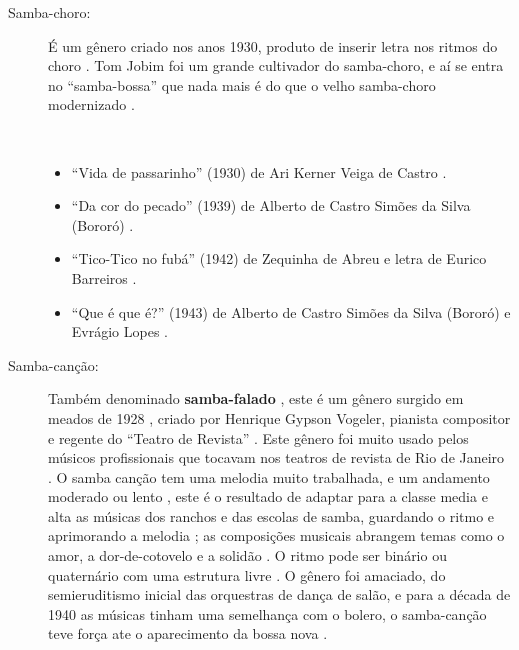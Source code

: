 \begin{description}
\item[Samba-choro:] 
É um gênero criado nos anos 1930, produto de inserir letra nos ritmos do choro \cite[pp. 291]{dourado2004dicionario}.
Tom Jobim foi um grande cultivador do samba-choro, 
e aí se entra no ``samba-bossa'' que nada mais é do que o velho samba-choro modernizado \cite[pp. 63]{reinato2010musica}.
\begin{example} ~

\begin{itemize}
\item ``Vida de passarinho'' (1930) de Ari Kerner Veiga de Castro  \cite[pp. 291]{dourado2004dicionario}.
\item ``Da cor do pecado'' (1939) de Alberto de Castro Simões da Silva (Bororó) \cite[pp. 105]{marcondes1977enciclopedia}.
\item ``Tico-Tico no fubá'' (1942) de Zequinha de Abreu e letra de Eurico Barreiros \cite[pp. 6]{marcondes1998enciclopedia} \cite[pp. 39,91]{diniz2003almanaque}.
\item ``Que é que é?''  (1943) de Alberto de Castro Simões da Silva (Bororó) e Evrágio Lopes \cite[pp. 105]{marcondes1977enciclopedia}.
\end{itemize}
\end{example}


\item[Samba-canção:] 
Também denominado \textbf{samba-falado} \cite[pp. 63]{reinato2010musica},
este é um gênero surgido em meados de 1928 \cite[pp. 63]{reinato2010musica} \cite[pp. 291]{dourado2004dicionario},
criado por Henrique Gypson Vogeler, pianista compositor e regente do ``Teatro de Revista'' \cite[pp. 63]{reinato2010musica}. 
Este gênero foi muito usado pelos músicos profissionais que tocavam nos teatros de revista de Rio de Janeiro \cite[pp. 291]{dourado2004dicionario}.
O samba canção tem uma melodia muito trabalhada, e um andamento moderado \cite[pp. 291]{dourado2004dicionario} ou lento \cite[pp. 63]{reinato2010musica}, 
este é o resultado de adaptar para a classe media e alta as músicas dos ranchos e das escolas de samba, 
guardando o ritmo e aprimorando a melodia \cite[pp. 4]{musicasambavariasdef1} \cite[pp. 128]{perna2002samba}; 
as composições musicais abrangem temas como o amor, a dor-de-cotovelo e a solidão \cite[pp. 291]{dourado2004dicionario}.
O ritmo pode ser binário ou quaternário com uma estrutura livre \cite[pp. 63]{reinato2010musica}.
O gênero foi amaciado, do semieruditismo inicial das orquestras de dança de salão, 
e para a década de 1940 as músicas tinham uma semelhança com o bolero,
o samba-canção teve força ate o aparecimento da bossa nova \cite[pp. 128]{perna2002samba}.
\begin{example} ~


\end{example}
\end{description}
